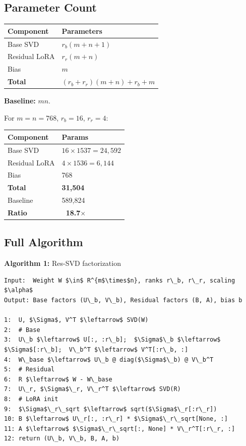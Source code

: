 \subsection{Parameter Count}

\begin{table}[H]
\centering
\small
\begin{tabular}{ll}
\toprule
\textbf{Component} & \textbf{Parameters} \\
\midrule
Base SVD & $r_b(m + n + 1)$ \\
Residual LoRA & $r_r(m + n)$ \\
Bias & $m$ \\
\textbf{Total} & $(r_b + r_r)(m + n) + r_b + m$ \\
\bottomrule
\end{tabular}
\end{table}

\textbf{Baseline:} $mn$.

For $m = n = 768$, $r_b = 16$, $r_r = 4$:

\begin{table}[H]
\centering
\small
\begin{tabular}{ll}
\toprule
\textbf{Component} & \textbf{Params} \\
\midrule
Base SVD & $16 \times 1537 = 24,592$ \\
Residual LoRA & $4 \times 1536 = 6,144$ \\
Bias & 768 \\
\textbf{Total} & \textbf{31,504} \\
Baseline & 589,824 \\
\textbf{Ratio} & \textbf{~18.7$\times$} \\
\bottomrule
\end{tabular}
\end{table}

\subsection{Full Algorithm}

\textbf{Algorithm 1:} Res-SVD factorization
\begin{lstlisting}
Input:  Weight W $\in$ R^{m$\times$n}, ranks r\_b, r\_r, scaling $\alpha$
Output: Base factors (U\_b, V\_b), Residual factors (B, A), bias b

1:  U, $\Sigma$, V^T $\leftarrow$ SVD(W)
2:  # Base
3:  U\_b $\leftarrow$ U[:, :r\_b];  $\Sigma$\_b $\leftarrow$ $\Sigma$[:r\_b];  V\_b^T $\leftarrow$ V^T[:r\_b, :]
4:  W\_base $\leftarrow$ U\_b @ diag($\Sigma$\_b) @ V\_b^T
5:  # Residual
6:  R $\leftarrow$ W - W\_base
7:  U\_r, $\Sigma$\_r, V\_r^T $\leftarrow$ SVD(R)
8:  # LoRA init
9:  $\Sigma$\_r\_sqrt $\leftarrow$ sqrt($\Sigma$\_r[:r\_r])
10: B $\leftarrow$ U\_r[:, :r\_r] * $\Sigma$\_r\_sqrt[None, :]
11: A $\leftarrow$ $\Sigma$\_r\_sqrt[:, None] * V\_r^T[:r\_r, :]
12: return (U\_b, V\_b, B, A, b)
\end{lstlisting}

